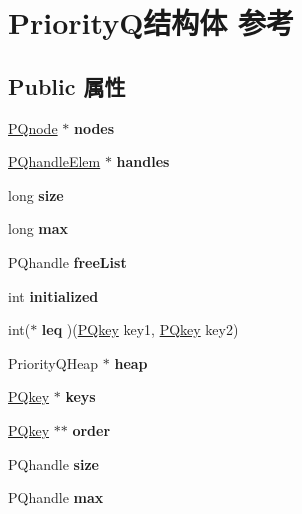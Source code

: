 \hypertarget{struct_priority_q}{}\section{Priority\+Q结构体 参考}
\label{struct_priority_q}
\subsection*{Public 属性}
\begin{DoxyCompactItemize}
\item 
\mbox{\label{struct_priority_q_a2b37af31a51ffeb92a52d9ccbbf73edc}} 
\hyperlink{struct_p_qnode}{P\+Qnode} $\ast$ {\bfseries nodes}
\item 
\mbox{\label{struct_priority_q_a3eaf8a1dbdd30b10126cbdcbc6b41bac}} 
\hyperlink{struct_p_qhandle_elem}{P\+Qhandle\+Elem} $\ast$ {\bfseries handles}
\item 
\mbox{\label{struct_priority_q_a9cbdc333b8d9d6787a575b850a4501a7}} 
long {\bfseries size}
\item 
\mbox{\label{struct_priority_q_a0359518303cfc72007e5dd837ce19a92}} 
long {\bfseries max}
\item 
\mbox{\label{struct_priority_q_a55c73592d4b87b7ef7fba96be65389fa}} 
P\+Qhandle {\bfseries free\+List}
\item 
\mbox{\label{struct_priority_q_ac2c2b6dc5e8a50d8f7404c2229b0154f}} 
int {\bfseries initialized}
\item 
\mbox{\label{struct_priority_q_aa1b316b04d821d557cd9546472a20bae}} 
int($\ast$ {\bfseries leq} )(\hyperlink{interfacevoid}{P\+Qkey} key1, \hyperlink{interfacevoid}{P\+Qkey} key2)
\item 
\mbox{\label{struct_priority_q_a544c65bedc2f6a0f78e462ba1b4e5432}} 
Priority\+Q\+Heap $\ast$ {\bfseries heap}
\item 
\mbox{\label{struct_priority_q_aebe590b714651a043a872ee774e4c2f3}} 
\hyperlink{interfacevoid}{P\+Qkey} $\ast$ {\bfseries keys}
\item 
\mbox{\label{struct_priority_q_a8e8fa9da39019c1e3115b8b6c35952af}} 
\hyperlink{interfacevoid}{P\+Qkey} $\ast$$\ast$ {\bfseries order}
\item 
\mbox{\label{struct_priority_q_a9cbdc333b8d9d6787a575b850a4501a7}} 
P\+Qhandle {\bfseries size}
\item 
\mbox{\label{struct_priority_q_a0359518303cfc72007e5dd837ce19a92}} 
P\+Qhandle {\bfseries max}
\end{DoxyCompactItemize}


